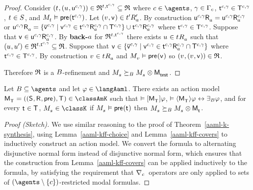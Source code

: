 \begin{proof}
Consider $(\kStateT, (\kStateU, \aStateU[\agentC, \gamma])) \in \refinement^{\kStateT, \aStateT[\agentC, \gamma]} \subseteq \refinement$ where $\agentC \in \agents$, $\gamma \in \Gamma_\agentC$, $\aStateT[\agentC, \gamma] \in \aStatesT[\agentC, \gamma]$, $\kStateT \in \kStates$, and $\kPModel{\kStateT} \entails \aPrecondition(\aStateT[\agentC, \gamma])$.
Let $(\kStateV, \aStateV) \in \kSuccessorsPA{\kStateTP}$.
By construction
$\aSuccessorsA{\aStateU[\agentC, \gamma]} = \aSuccessorsA[\agentC, \gamma]{\aStateU[\agentC, \gamma]}$ or 
$\aSuccessorsA{\aStateU[\agentC, \gamma]} = \{\aPStateV[\agentC, \gamma] \mid \aStateV[\agentC, \gamma] \in \aSuccessorsA[\agentC, \gamma]{\aStateT[\agentC, \gamma]} \cap \aStatesT[\agentC, \gamma]\} \cup \aSuccessorsA[\agentC, \gamma]{\aStateT[\agentC, \gamma]}$ where $\aStateT[\agentC, \gamma] \in \aStatesT[\agentC, \gamma]$.
Suppose that $\aStateV \in \aSuccessorsA[\agentC, \gamma]{\aStateU[\agentC, \gamma]}$.
By {\bf back-$\agentA$} for $\refinement^{\kStateT, \aStateT[\agentC, \gamma]}$ there exists $\kStateU \in \kSuccessorsA{\kStateT}$ such that $(\kStateU, \kStateUP) \in \refinement^{\kStateT, \aStateT[\agentC, \gamma]} \subseteq \refinement$.
Suppose that $\aStateV \in \{\aPStateV[\agentC, \gamma] \mid \aStateV[\agentC, \gamma] \in \aSuccessorsA[\agentC, \gamma]{\aStateT[\agentC, \gamma]} \cap \aStatesT[\agentC, \gamma]\}$ where $\aStateT[\agentC, \gamma] \in \aStatesT[\agentC, \gamma]$.
By construction $\kStateV \in \kSuccessorsA{\kStateT}$ and $\kPModel{\kStateV} \entails \aPrecondition(\aStateV)$ so $(\kStateV, (\kStateV, \aStateV)) \in \refinement$.

Therefore $\refinement$ is a $\agentsB$-refinement and $\kPModel{\kStateS} \simulatesBs \kPModel{\kStateS} \exec \aPModel{\aStateTest}$.

\end{proof}

\begin{theorem}\label{aaml-s-synthesis}
Let $\agentsB \subseteq \agents$ and let $\phi \in \langAaml$.
There exists an action model $\aPModelAndTuple{\aStatesT} \in \classAmK$ such that 
$\entails \actionA{\aPModel{\aStatesT}} \phi$,
$\entails \actionE{\aPModel{\aStatesT}} \phi \iff \someactsBs \phi$, and
for every $\aStateT \in \aStatesT$, $\kPModel{\kStateS} \in \classK$ if $\kPModel{\kStateS} \entails \aPrecondition(\aStateT)$ then $\kPModel{\kStateS} \simulatesBs \kPModel{\kStateS} \exec \aPModel{\aStateT}$.
\end{theorem}

\begin{proof}[Proof (Sketch)]
We use similar reasoning to the proof of Theorem~\ref{aaml-k-synthesis}, using Lemma~\ref{aaml-kff-choice} and Lemma~\ref{aaml-kff-covers} to inductively construct an action model.
We convert the formula to alternating disjunctive normal form instead of disjunctive normal form, which ensures that the construction from Lemma~\ref{aaml-kff-covers} can be applied inductively to the formula, by satisfying the requirement that $\coversC$~operators are only applied to sets of $(\agents \setminus \{\agentC\})$-restricted modal formulas.
\end{proof}

